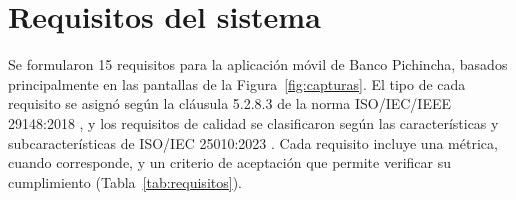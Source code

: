 \documentclass[11pt,a4paper]{article}
\begin{document}
\section{Requisitos del sistema}
Se formularon 15 requisitos para la aplicación móvil de Banco Pichincha, basados principalmente en las pantallas de la Figura~\ref{fig:capturas}. El tipo de cada requisito se asignó según la cláusula 5.2.8.3 de la norma ISO/IEC/IEEE 29148:2018 \cite{iso29148}, y los requisitos de calidad se clasificaron según las características y subcaracterísticas de ISO/IEC 25010:2023 \cite{iso25010}. Cada requisito incluye una métrica, cuando corresponde, y un criterio de aceptación que permite verificar su cumplimiento (Tabla~\ref{tab:requisitos}).
\end{document}
